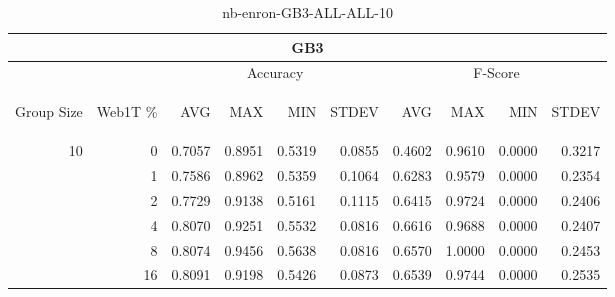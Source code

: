 \begin{center}
\begin{table}[htbp] 
 \begin{center}
\begin{tabular}{ | r | r | r | r | r | r | r | r | r | r |}
\hline
\multicolumn{10}{|c|}{GB3}\\
\hline
 & & \multicolumn{4}{|c|}{Accuracy} & \multicolumn{4}{|c|}{F-Score}\\ \cline{3-10}
\begin{sideways}Group Size\end{sideways} & \begin{sideways}Web1T \%\end{sideways} & \begin{sideways}AVG\end{sideways} & \begin{sideways}MAX\end{sideways} & \begin{sideways}MIN\end{sideways} & \begin{sideways}STDEV\end{sideways} & \begin{sideways}AVG\end{sideways} & \begin{sideways}MAX\end{sideways} & \begin{sideways}MIN\end{sideways} & \begin{sideways}STDEV\end{sideways}\\
\hline
\multirow{5}{*}{10}
 & 0 & 0.7057 & 0.8951 & 0.5319 & 0.0855 & 0.4602 & 0.9610 & 0.0000 & 0.3217\\ \cline{2-10}
 & 1 & 0.7586 & 0.8962 & 0.5359 & 0.1064 & 0.6283 & 0.9579 & 0.0000 & 0.2354\\ \cline{2-10}
 & 2 & 0.7729 & 0.9138 & 0.5161 & 0.1115 & 0.6415 & 0.9724 & 0.0000 & 0.2406\\ \cline{2-10}
 & 4 & 0.8070 & 0.9251 & 0.5532 & 0.0816 & 0.6616 & 0.9688 & 0.0000 & 0.2407\\ \cline{2-10}
 & 8 & 0.8074 & 0.9456 & 0.5638 & 0.0816 & 0.6570 & 1.0000 & 0.0000 & 0.2453\\ \cline{2-10}
 & 16 & 0.8091 & 0.9198 & 0.5426 & 0.0873 & 0.6539 & 0.9744 & 0.0000 & 0.2535\\ \cline{2-10}
\hline
\end{tabular}
\caption{nb-enron-GB3-ALL-ALL-10}
\label{table:nb-enron-GB3-ALL-ALL-10}
\end{center}
 \end{table}
\end{center}


